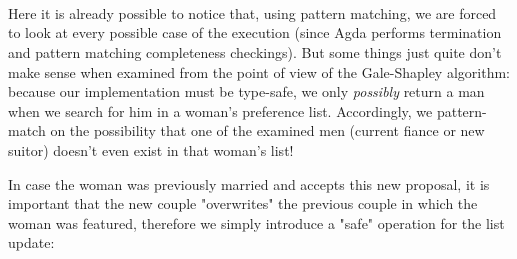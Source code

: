 {\begin{code}
\>[0]\AgdaSpace{}%
\AgdaSymbol{|}\AgdaSpace{}%
\AgdaSpace{}%
\AgdaSymbol{|}\AgdaSpace{}%
\AgdaSpace{}%
%
\>[24]\AgdaSymbol{=}\AgdaSpace{}%
\<%
\\
\>[0]\<%
\\
\>[0]\AgdaSpace{}%
\AgdaSymbol{|}\AgdaSpace{}%
\AgdaSpace{}%
\AgdaSymbol{|}\AgdaSpace{}%
\AgdaSpace{}%
\AgdaSymbol{=}\AgdaSpace{}%
\<%
\\
\>[0]\<%
\end{code}

Here it is already possible to notice that, using pattern matching, we are forced to look at every possible case of the execution (since Agda performs termination and pattern matching completeness checkings). But some things just quite don't make sense when examined from the point of view of the Gale-Shapley algorithm: because our implementation must be type-safe, we only \emph{possibly} return a man when we search for him in a woman's preference list. Accordingly, we pattern-match on the possibility that one of the examined men (current fiance or new suitor) doesn't even exist in that woman's list!

In case the woman was previously married and accepts this new proposal, it is important that the new couple "overwrites" the previous couple in which the woman was featured, therefore we simply introduce a "safe" operation for the list update:

}
